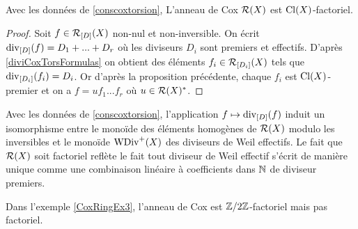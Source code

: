 \begin{thm}
Avec les données de \ref{conscoxtorsion}, L'anneau de Cox $\mathcal{R}(X)$ est $\operatorname{Cl}(X)$-factoriel.
\end{thm}
\begin{proof}
Soit $f\in\mathcal{R}_{[D]}(X)$ non-nul et non-inversible. On écrit $\operatorname{div}_{[D]}(f)=D_1+...+D_r$ où les diviseurs $D_i$ sont premiers et effectifs. D'après \ref{diviCoxTorsFormulas} on obtient des éléments $f_i\in\mathcal{R}_{[D_i]}(X)$ tels que $\operatorname{div}_{[D_i]}(f_i)=D_i$. Or d'après la proposition précédente, chaque $f_i$ est $\operatorname{Cl}(X)$-premier et on a $f=uf_1...f_r$ où $u\in\mathcal{R}(X)^*$.
\end{proof}

\begin{rem}
Avec les données de \ref{conscoxtorsion}, l'application $f\mapsto \operatorname{div}_{[D]}(f)$ induit un isomorphisme entre le monoïde des éléments homogènes de $\mathcal{R}(X)$ modulo les inversibles et le monoïde $\operatorname{WDiv}^+(X)$ des diviseurs de Weil effectifs. Le fait que $\mathcal{R}(X)$ soit factoriel reflète le fait tout diviseur de Weil effectif s'écrit de manière unique comme une combinaison linéaire à coefficients dans $\mathbb{N}$ de diviseur premiers.
\end{rem}

\begin{ex}
Dans l'exemple \ref{CoxRingEx3}, l'anneau de Cox est $\mathbb{Z}/2\mathbb{Z}$-factoriel mais pas factoriel.
\end{ex}

